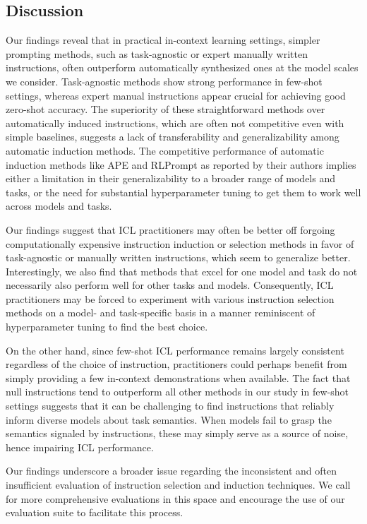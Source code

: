 \subsection{Discussion}
Our findings reveal that in practical in-context learning settings, simpler prompting methods, such as task-agnostic or expert manually written instructions, often outperform automatically synthesized ones at the model scales we consider. Task-agnostic methods show strong performance in few-shot settings, whereas expert manual instructions appear crucial for achieving good zero-shot accuracy. The superiority of these straightforward methods over automatically induced instructions, which are often not competitive even with simple baselines, suggests a lack of transferability and generalizability among automatic induction methods. The competitive performance of automatic induction methods like APE and RLPrompt as reported by their authors implies either a limitation in their generalizability to a broader range of models and tasks, or the need for substantial hyperparameter tuning to get them to work well across models and tasks.

Our findings suggest that ICL practitioners may often be better off forgoing computationally expensive instruction induction or selection methods in favor of task-agnostic or manually written instructions, which seem to generalize better. Interestingly, we also find that methods that excel for one model and task do not necessarily also perform well for other tasks and models. Consequently, ICL practitioners may be forced to experiment with various instruction selection methods on a model- and task-specific basis in a manner reminiscent of hyperparameter tuning to find the best choice.

On the other hand, since few-shot ICL performance remains largely consistent regardless of the choice of instruction, practitioners could perhaps benefit from simply providing a few in-context demonstrations when available. The fact that null instructions tend to outperform all other methods in our study in few-shot settings suggests that it can be challenging to find instructions that reliably inform diverse models about task semantics. When models fail to grasp the semantics signaled by instructions, these may simply serve as a source of noise, hence impairing ICL performance.

Our findings underscore a broader issue regarding the inconsistent and often insufficient evaluation of instruction selection and induction techniques. We call for more comprehensive evaluations in this space and encourage the use of our evaluation suite to facilitate this process. 